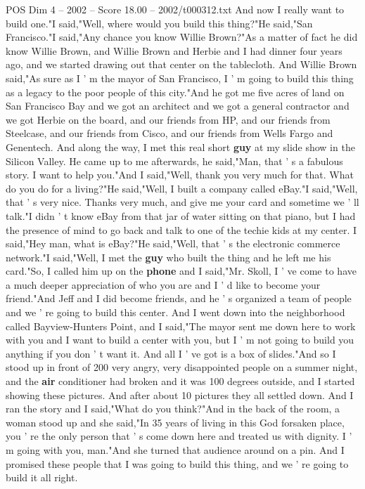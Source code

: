 \begin{textsample}{POS Dim 4 – 2002 – Score 18.00 – 2002/t000312.txt}
And now I really want to build one."I said,"Well, where would you build this thing?"He said,"San Francisco."I said,"Any chance you know Willie Brown?"As a matter of fact he did know Willie Brown, and Willie Brown and Herbie and I had dinner four years ago, and we started drawing out that center on the tablecloth.
And Willie Brown said,"As sure as I ' m the mayor of San Francisco, I ' m going to build this thing as a legacy to the poor people of this city."And he got me five acres of land on San Francisco Bay and we got an architect and we got a general contractor and we got Herbie on the board, and our friends from HP, and our friends from Steelcase, and our friends from Cisco, and our friends from Wells Fargo and Genentech.
And along the way, I met this real short \textbf{guy} at my slide show in the Silicon Valley.
He came up to me afterwards, he said,"Man, that ' s a fabulous story.
I want to help you."And I said,"Well, thank you very much for that.
What do you do for a living?"He said,"Well, I built a company called eBay."I said,"Well, that ' s very nice.
Thanks very much, and give me your card and sometime we ' ll talk."I didn ' t know eBay from that jar of water sitting on that piano, but I had the presence of mind to go back and talk to one of the techie kids at my center.
I said,"Hey man, what is eBay?"He said,"Well, that ' s the electronic commerce network."I said,"Well, I met the \textbf{guy} who built the thing and he left me his card."So, I called him up on the \textbf{phone} and I said,"Mr.
Skoll, I ' ve come to have a much deeper appreciation of who you are and I ' d like to become your friend."And Jeff and I did become friends, and he ' s organized a team of people and we ' re going to build this center.
And I went down into the neighborhood called Bayview-Hunters Point, and I said,"The mayor sent me down here to work with you and I want to build a center with you, but I ' m not going to build you anything if you don ' t want it.
And all I ' ve got is a box of slides."And so I stood up in front of 200 very angry, very disappointed people on a summer night, and the \textbf{air} conditioner had broken and it was 100 degrees outside, and I started showing these pictures.
And after about 10 pictures they all settled down.
And I ran the story and I said,"What do you think?"And in the back of the room, a woman stood up and she said,"In 35 years of living in this God forsaken place, you ' re the only person that ' s come down here and treated us with dignity.
I ' m going with you, man."And she turned that audience around on a pin.
And I promised these people that I was going to build this thing, and we ' re going to build it all right.

\end{textsample}
